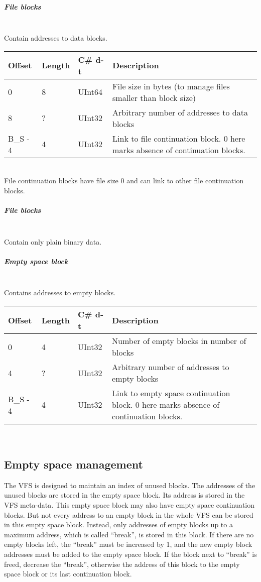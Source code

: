 \documentclass[a4paper,12pt]{article}
\begin{document}
\subparagraph{File blocks} \mbox{} \\

Contain addresses to data blocks.\\

\begin{tabular}{|p{1.5cm}|p{1.5cm}|p{1.5cm}|p{7cm}|}\hline
Offset 	&Length	&C\# d-t	&Description\\\hline
0	&8	&UInt64	&File size in bytes (to manage files smaller than block size)\\
8	&?	&UInt32	&Arbitrary number of addresses to data blocks\\
B\_S - 4	&4	&UInt32	&Link to file continuation block. 0 here marks absence of continuation blocks.\\\hline
\end{tabular} \\

File continuation blocks have file size 0 and can link to other file continuation blocks.

\subparagraph{File blocks} \mbox{} \\

Contain only plain binary data.

\subparagraph{Empty space block} \mbox{} \\

Contains addresses to empty blocks.\\

\begin{tabular}{|p{1.5cm}|p{1.5cm}|p{1.5cm}|p{7cm}|}\hline
Offset 	&Length	&C\# d-t	&Description\\\hline
0	&4	&UInt32	&Number of empty blocks in number of blocks\\
4	&?	&UInt32	&Arbitrary number of addresses to empty blocks\\
B\_S - 4	&4	&UInt32	&Link to empty space continuation block. 0 here marks absence of continuation blocks.\\\hline
\end{tabular} \\

\subsection{Empty space management}\label{sct:empty}

The VFS is designed to maintain an index of unused blocks. The addresses of the unused blocks are stored in the empty space block. Its address is stored in the VFS meta-data. This empty space block may also have empty space continuation blocks. But not every address to an empty block in the whole VFS can be stored in this empty space block. Instead, only addresses of empty blocks up to a maximum address, which is called “break”, is stored in this block. If there are no empty blocks left, the “break” must be increased by 1, and the new empty block addresses must be added to the empty space block. If the block next to “break” is freed, decrease the “break”, otherwise the address of this block to the empty space block or its last continuation block.
\end{document}
